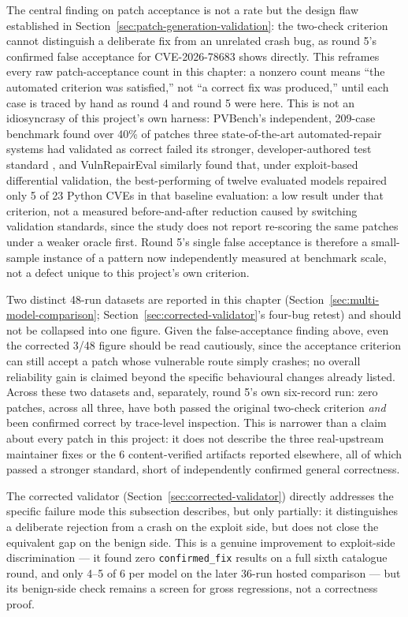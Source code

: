 \documentclass[12pt,a4paper]{report}
\begin{document}
The central finding on patch acceptance is not a rate but the design flaw established in Section~\ref{sec:patch-generation-validation}: the two-check criterion cannot distinguish a deliberate fix from an unrelated crash bug, as round 5's confirmed false acceptance for CVE-2026-78683 shows directly. This reframes every raw patch-acceptance count in this chapter: a nonzero count means ``the automated criterion was satisfied,'' not ``a correct fix was produced,'' until each case is traced by hand as round 4 and round 5 were here. This is not an idiosyncrasy of this project's own harness: PVBench's independent, 209-case benchmark found over 40\% of patches three state-of-the-art automated-repair systems had validated as correct failed its stronger, developer-authored test standard \cite{pvbench}, and VulnRepairEval similarly found that, under exploit-based differential validation, the best-performing of twelve evaluated models repaired only 5 of 23 Python CVEs \cite{vulnrepaireval} in that baseline evaluation: a low result under that criterion, not a measured before-and-after reduction caused by switching validation standards, since the study does not report re-scoring the same patches under a weaker oracle first. Round 5's single false acceptance is therefore a small-sample instance of a pattern now independently measured at benchmark scale, not a defect unique to this project's own criterion.

Two distinct 48-run datasets are reported in this chapter (Section~\ref{sec:multi-model-comparison}; Section~\ref{sec:corrected-validator}'s four-bug retest) and should not be collapsed into one figure. Given the false-acceptance finding above, even the corrected 3/48 figure should be read cautiously, since the acceptance criterion can still accept a patch whose vulnerable route simply crashes; no overall reliability gain is claimed beyond the specific behavioural changes already listed. Across these two datasets and, separately, round 5's own six-record run: zero patches, across all three, have both passed the original two-check criterion \emph{and} been confirmed correct by trace-level inspection. This is narrower than a claim about every patch in this project: it does not describe the three real-upstream maintainer fixes or the 6 content-verified artifacts reported elsewhere, all of which passed a stronger standard, short of independently confirmed general correctness.

The corrected validator (Section~\ref{sec:corrected-validator}) directly addresses the specific failure mode this subsection describes, but only partially: it distinguishes a deliberate rejection from a crash on the exploit side, but does not close the equivalent gap on the benign side. This is a genuine improvement to exploit-side discrimination — it found zero \texttt{confirmed\_fix} results on a full sixth catalogue round, and only 4--5 of 6 per model on the later 36-run hosted comparison — but its benign-side check remains a screen for gross regressions, not a correctness proof.
\end{document}
